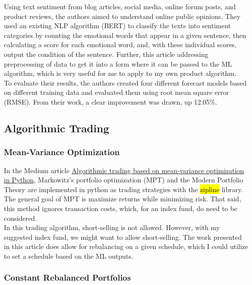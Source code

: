 \documentclass{article}
\begin{document}
Using text sentiment from blog articles, social media, online forum posts, and product reviews, the authors aimed to understand online public opinions. They used an existing NLP algorithm (BERT) to classify the texts into sentiment categories by counting the emotional words that appear in a given sentence, then calculating a score for each emotional word, and, with these individual scores, output the condition of the sentence. Further, this article addressing preprocessing of data to get it into a form where it can be passed to the ML algorithm, which is very useful for me to apply to my own product algorithm. \\

To evaluate their results, the authors created four different forecast models based on different training data and evaluated them using root mean square error (RMSE). From their work, a clear improvement was drawn, up 12.05\%.

\subsection{Algorithmic Trading}

\subsubsection{Mean-Variance Optimization}

In the Medium article \href{https://towardsdatascience.com/algorithmic-trading-based-on-mean-variance-optimization-in-python-62bdf844ac5b}{Algorithmic trading based on mean-variance optimization in Python}, Markowitz's portfolio optimization (MPT) and the Modern Portfolio Theory are implemented in python as trading strategies with the \hl{zipline} library. The general goal of MPT is maximize returns while minimizing risk. That said, this method ignores transaction costs, which, for an index fund, do need to be considered. \\

In this trading algorithm, short-selling is not allowed. However, with my suggested index fund, we might want to allow short-selling. The work presented in this article does allow for rebalancing on a given schedule, which I could utilize to set a schedule based on the ML outputs.

\subsubsection{Constant Rebalanced Portfolios}
\end{document}
